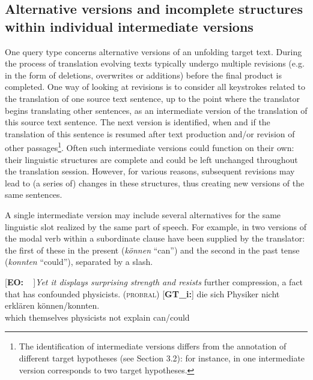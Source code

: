 \documentclass[output=paper]{LSP/langsci}
\begin{document}
\subsection{Alternative versions and incomplete structures within individual intermediate versions}
One query type concerns alternative versions of an unfolding target text. During the process of translation evolving texts typically undergo multiple revisions (e.g. in the form of deletions, overwrites or additions) before the final product is completed. One way of looking at revisions is to consider all keystrokes related to the translation of one source text sentence, up to the point where the translator begins translating other sentences, as an intermediate version of the translation of this source text sentence. The next version is identified, when and if the translation of this sentence is resumed after text production and/or revision of other passages\footnote{The identification of intermediate versions differs from the annotation of different target hypotheses (see Section 3.2): for instance, in  one intermediate version corresponds to two target hypotheses.}. Often such intermediate versions could function on their own: their linguistic structures are complete and could be left unchanged throughout the translation session. However, for various reasons, subsequent revisions may lead to (a series of) changes in these structures, thus creating new versions of the same sentences.

A single intermediate version may include several alternatives for the same linguistic slot realized by the same part of speech. For example, in  two versions of the modal verb within a subordinate clause have been supplied by the translator: the first of these in the present (\textit{können} “can”) and the second in the past tense (\textit{konnten} “could”), separated by a slash.


\ea \label{ex:1:4}
\begin{xlist}
\exi{}[\textbf{EO:~~}]{\emph{Yet it displays surprising strength and resists} further compression, a fact that has confounded physicists. (\textsc{probral})}
\exi{}[\textbf{GT\_i:}]{
\gll  [{\dots}] die\raute{} sich\raute{} Physiker\raute{} nicht\raute{} erklären\raute{} können\stern{}/konnten.\\
{}  which themselves physicists not explain can/could\\
}
\end{xlist}
\z
\end{document}
